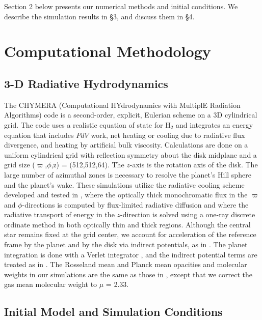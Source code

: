 \documentclass[12pt,manuscript,authoryear]{aastex}
\begin{document}
Section 2 below presents our numerical methods and initial conditions.  We describe the simulation results in \S3, and discuss them in \S4.  

\section{Computational Methodology}

\subsection{3-D Radiative Hydrodynamics}

The CHYMERA (Computational HYdrodynamics with MultiplE Radiation Algorithms) code \citep{boley2007b} is a second-order, explicit, Eulerian scheme on a 3D cylindrical grid. The code uses a realistic equation of state for H$_2$ \citep{boley2007} and integrates an energy equation that includes $PdV$ work, net heating or cooling due to radiative flux divergence, and heating by artificial bulk viscosity. Calculations are done on a uniform cylindrical grid with reflection symmetry about the disk midplane and a grid size ($\varpi$,$\phi$,z) = (512,512,64). 
The $z$-axis is the rotation axis of the disk. The large number of azimuthal zones is necessary to resolve the planet's Hill sphere and the planet's wake. These simulations utilize the radiative cooling scheme developed and tested in \citet{boley2007b}, where the optically thick monochromatic flux in the $\varpi$ and $\phi$-directions is computed by flux-limited radiative diffusion and where the radiative transport of energy in the $z$-direction is solved using a one-ray discrete ordinate method in both optically thin and thick regions. Although the central star remains fixed at the grid center, we account for acceleration of the reference frame by the planet and by the disk via indirect potentials, as in \citet{michael2010}. The planet integration is done with a Verlet integrator \citep[e.g.,][]{hut1995}, and the indirect potential terms are treated as in \citet{nelson2000a}. The Rosseland mean and Planck mean opacities and molecular weights in our simulations are the same as those in \citet{boley2006,boley2007b}, except that we correct the \citet{dalessio2001} gas mean molecular weight to $\mu$ = 2.33.

\subsection{Initial Model and Simulation Conditions}
\end{document}
